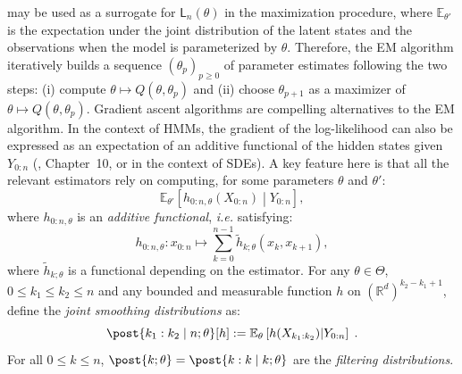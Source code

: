 \documentclass{article}
\newcommand{\llh}[1]{\mathsf{L}_{#1}}
\newcommand{\parvec}{\theta}
\newcommand{\parspace}{\Theta}
\newcommand{\af}[1]{h_{#1}}
\newcommand{\addf}[1]{\termletter_{#1}}
\newcommand{\termletter}{\tilde{h}}
\def\pE{\mathbb{E}}
\newcommand{\eqdef}{\ensuremath{:=}}
\newcommand{\eqsp}{\;}
\newcommand{\qg}[1]{\ell_{#1}}
\begin{document}
may be used as a surrogate for $\llh{n}(\parvec)$ in the maximization procedure,  where $\pE_{\parvec'}$ is the expectation under the joint distribution of the latent states and the observations when the model is parameterized by $\parvec$. 
Therefore, the EM algorithm iteratively builds a sequence $(\parvec_{p})_{p\geqslant 0}$ of parameter estimates following the two steps: (i) compute $\parvec\mapsto Q(\parvec,\parvec_{p})$ and (ii) choose $\parvec_{p+1}$ as a maximizer of $\parvec \mapsto Q(\parvec,\parvec_{p})$. Gradient ascent algorithms are compelling alternatives to the EM algorithm. 
In the context of HMMs, the gradient of the log-likelihood can also be expressed  as an expectation of an additive functional of the hidden states given $Y_{0:n}$ (\cite{cappe2005inference}, Chapter~10, or \cite{gloaguen2018online} in the context of SDEs). A key feature here is that all the relevant estimators rely on computing, for some parameters $\parvec$ and $\parvec'$:
$$\pE_{\parvec'}\left[\af{0:n,\parvec}(X_{0:n})\middle | Y_{0:n}\right],$$
where $\af{0:n,\parvec}$ is an \textit{additive functional}, \textit{i.e.} satisfying:
$$\af{0:n,\parvec}: x_{0:n} \mapsto \sum_{k=0}^{n-1}\addf{k;\parvec}(x_{k},x_{k+1}),$$
where $\addf{k;\parvec}$ is a functional depending on the estimator.
For any $\parvec\in\parspace$, $0 \leqslant k_1 \leqslant k_2 \leqslant n$ and any bounded and measurable function $h$ on $(\mathbb{R}^d)^{k_2 - k_1 +1}$,  define the \textit{joint smoothing distributions} as:
\begin{equation}
\label{eq:smooth}
\post{k_1:k_2 \mid n;\parvec}[h] \eqdef  \pE_{\parvec}\left[h(X_{k_1:k_2})\middle | Y_{0:n}\right]\eqsp.
\end{equation}
For all $0\leqslant k\leqslant n$, $\post{k;\parvec}=\post{k:k\mid k;\parvec}$ are the \textit{filtering distributions}.
\end{document}
